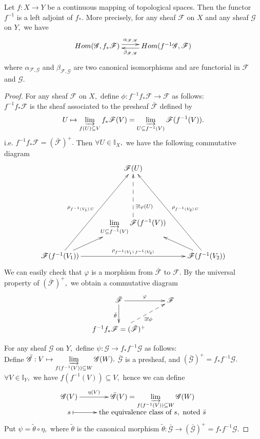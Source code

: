 \begin{thm}
Let $f:X\rightarrow Y$ be a continuous mapping of topological
spaces. Then the functor $f^{-1}$ is a left adjoint of $f_{\ast}.$
More precisely, for any sheaf $\mathscr{F}$ on $X$ and any sheaf
$\mathscr{G}$ on $Y,$ we have
\[ \xymatrix{
   Hom(\mathscr{G}, f_{\ast}\mathscr{F})
   \ar@<.6ex>[r]^-{\alpha_{\mathscr{F},\mathscr{G}}} & Hom(f^{-1}\mathscr{G},
   \mathscr{F}) \ar@<.6ex>[l]^-{\beta_{\mathscr{F},\mathscr{G}}} }
\]
where $\alpha_{\mathscr{F},\mathscr{G}}$ and
$\beta_{\mathscr{F},\mathscr{G}}$ are two canonical isomorphisms and
are functorial in $\mathscr{F}$ and $\mathscr{G}.$
\end{thm}
\begin{proof}
For any sheaf $\mathscr{F}$ on $X,$ define $\phi:
f^{-1}f_{\ast}\mathscr{F}\rightarrow \mathscr{F}$ as follows:\\
$f^{-1}f_{\ast}\mathscr{F}$ is the sheaf associated to the presheaf
$\bar{\mathscr{F}}$ defined by
$$U\mapsto \varinjlim\limits_{f(U)\subseteq V} f_{\ast}\mathscr{F}(V)
= \varinjlim\limits_{U\subseteq f^{-1}(V)} \mathscr{F}(f^{-1}(V)).$$
i.e. $f^{-1}f_{\ast}\mathscr{F}=(\bar{\mathscr{F}})^+.$ Then
$\forall U\in \mathds{I}_X,$ we have the following commutative
diagram
\[ \xymatrix{
   & \mathscr{F}(U) \\\\
   & {\varinjlim\limits_{U\subseteq f^{-1}(V)}
   \mathscr{F}(f^{-1}(V))} \ar@{-->}[uu]_(.3){\exists! \varphi(U)} \\
   \mathscr{F}(f^{-1}(V_1)) \ar[ur] \ar"1,2"^{\rho_{f^{-1}(V_1)\,U}}
   \ar[rr]^-{\rho_{f^{-1}(V_1)\,f^{-1}(V_2)}} & &
   \mathscr{F}(f^{-1}(V_2)) \ar[ul] \ar"1,2"_{\rho_{f^{-1}(V_2)\,U}}
   }  \]
We can easily check that $\varphi$ is a morphism from
$\bar{\mathscr{F}}$ to $\mathscr{F}.$ By the universal property of
$(\bar{\mathscr{F}})^+,$ we obtain a commutative diagram
\[ \xymatrix{
   \bar{\mathscr{F}} \ar[r]^-{\varphi} \ar[d]_{\bar{\theta}} &
   \mathscr{F}                   \\
   f^{-1}f_{\ast}\mathscr{F}=(\bar{\mathscr{F}})^+ \ar@{-->}[ur]_{\exists!
   \phi} }  \]

For any sheaf $\mathscr{G}$ on $Y,$ define $\psi:
\mathscr{G}\rightarrow f_{\ast}f^{-1}\mathscr{G}$ as follows:\\
Define $\bar{\mathscr{G}}: V\mapsto
\varinjlim\limits_{f(f^{-1}(V))\subseteq W}\mathscr{G}(W).$
$\bar{\mathscr{G}}$ is a presheaf, and $(\bar{\mathscr{G}})^+ =
f_{\ast}f^{-1}\mathscr{G}.$ $\forall V\in \mathds{I}_Y,$ we have
$f(f^{-1}(V))\subseteq V,$ hence we can define
\[ \xymatrix@R=0em{
   \mathscr{G}(V) \ar[r]^-{\eta(V)} & \bar{\mathscr{G}}(V)=\varinjlim\limits_{f(f^{-1}(V))\subseteq
   W}\mathscr{G}(W)           \\
   s \ar@{|->}[r] & \text{the equivalence class of }s,\text{ noted
   }\bar{s} }  \]
Put $\psi=\tilde{\theta}\circ\eta,$ where $\tilde{\theta}$ is the
canonical morphism $\tilde{\theta}: \bar{\mathscr{G}}\rightarrow
(\bar{\mathscr{G}})^+=f_{\ast}f^{-1}\mathscr{G}.$


\end{proof}
